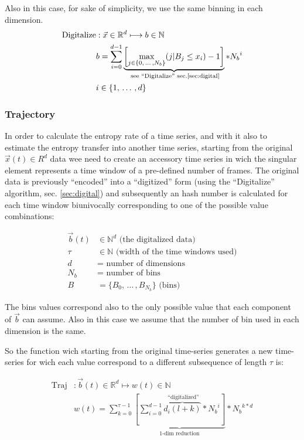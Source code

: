 \documentclass[a4paper]{article}
\begin{document}
Also in this case, for sake of simplicity, we use the same binning in each dimension.
\begin{align*}
 \text{Digitalize} &: \vec{x} \in \mathbb{R}^d \longmapsto b \in \mathbb{N} \\
 { }               & b = \sum_{i=0}^{d-1} \underbrace{\left [ \max_{\substack{j \in \{0,\,\dots\,,N_b\} }} (j | B_j \leq x_i) - 1 \right ]}_{\text{ see ``Digitalize'' sec.\ref{sec:digital}}} * {N_b}^i\\ 
 { }               & i \in \{1,\,\dots\,,d\}
\end{align*}

\subsubsection{Trajectory}\label{sec:traj}
In order to calculate the entropy rate of a time series, and with it also to estimate the entropy transfer into another time series, starting from the original $\vec{x}(t) \in R^d$ data wee need to create an accessory time series in wich the singular element represents a time window of a pre-defined number of frames. The original data is previously ``encoded'' into a ``digitized'' form (using the ``Digitalize'' algorithm, sec. \ref{sec:digital}) and subsequently an hash number is calculated for each time window biunivocally corresponding to one of the possible value combinations:

\begin{align*}
 \vec{b}(t) &\in \mathbb{N}^d \text{ (the digitalized data)}\\
 \tau       &\in \mathbb{N} \text{ (width of the time windows used)}\\
 d          &=   \text{ number of dimensions}\\
 {N_b}      &=   \text{ number of bins} \\
 {B}        &=   \{ B_0,\,\dots\, ,B_{{N_b}} \}\text{ (bins)}
\end{align*}

The bins values correspond also to the only possible value that each component of $\vec{b}$ can assume. Also in this case we assume that the number of bin used in each dimension is the same.

So the function wich starting from the original time-series generates a new time-series for wich each value correspond to a different subsequence of length $\tau$ is:

\begin{align*}
 \text{Traj} &: \vec{b}(t) \in \mathbb{R}^d \longmapsto w(t) \in \mathbb{N} \\
 { }         & w(t) = \sum_{k=0}^{\tau-1} \underbrace{\left [ \sum_{i=0}^{d-1} \overbrace{d_i(l+k)}^{\text{ ``digitalized''}} * {N_b}^i \right ]}_{\text{1-dim reduction}} * {N_b}^{k*d}
\end{align*}
\end{document}

